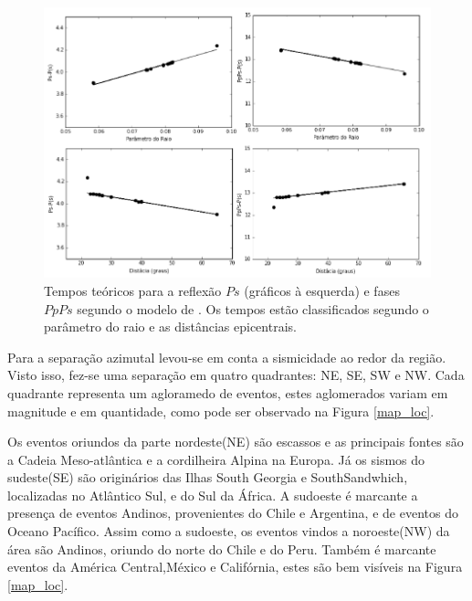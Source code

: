 \begin{figure}[!ht]
\centering
\includegraphics[scale=0.7]{Figs/tempo_teorico_modelo_tauptime.png}
\caption[Tempos teóricos para a reflexão $Ps$ (gráficos à esquerda) e fases $PpPs$ segundo o modelo de \cite{kennet_iaspei_1991}.]{Tempos teóricos para a reflexão $Ps$ (gráficos à esquerda) e fases $PpPs$ segundo o modelo de \cite{kennet_iaspei_1991}. Os tempos estão classificados segundo o parâmetro do raio e as distâncias epicentrais.}
\label{tauptime}
\end{figure}

Para a separação azimutal levou-se em conta a sismicidade ao redor da região. Visto isso, fez-se uma separação em quatro quadrantes: NE, SE, SW e NW. Cada quadrante representa um agloramedo de eventos, estes aglomerados variam em magnitude e em quantidade, como pode ser observado na Figura \ref{map_loc}. 

Os eventos oriundos da parte nordeste(NE) são escassos e as principais fontes são a Cadeia Meso-atlântica e a cordilheira Alpina na Europa. Já os sismos do sudeste(SE) são originários das Ilhas South Georgia e SouthSandwhich, localizadas no Atlântico Sul, e do Sul da África. A sudoeste é marcante a presença de eventos Andinos, provenientes do Chile e Argentina, e de eventos do Oceano Pacífico. Assim como a sudoeste, os eventos vindos a noroeste(NW) da área são Andinos, oriundo do norte do Chile e do Peru. Também é marcante eventos da América Central,México e Califórnia, estes são bem visíveis na Figura \ref{map_loc}.

\pagebreak
